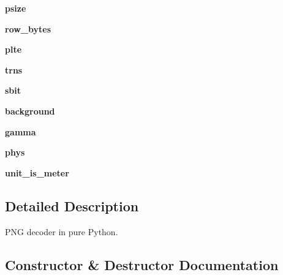 \begin{DoxyCompactItemize}
{\bfseries psize}
\item 
\mbox{\label{classlib_1_1png_1_1_reader_ab8959119a3485bb8f156776dcef51fe1}} 
{\bfseries row\+\_\+bytes}
\item 
\mbox{\label{classlib_1_1png_1_1_reader_a109bee51b6befa0aba939358eb238b54}} 
{\bfseries plte}
\item 
\mbox{\label{classlib_1_1png_1_1_reader_a75480dedbc8a789e3f3a4e38e8285377}} 
{\bfseries trns}
\item 
\mbox{\label{classlib_1_1png_1_1_reader_a48db770b0e7c0bf9b7e96a12c47d0c56}} 
{\bfseries sbit}
\item 
\mbox{\label{classlib_1_1png_1_1_reader_a8e6bc9daae77e2e47ce994159bdcf917}} 
{\bfseries background}
\item 
\mbox{\label{classlib_1_1png_1_1_reader_a7956a3dab9c08caf0f2325798ceb910b}} 
{\bfseries gamma}
\item 
\mbox{\label{classlib_1_1png_1_1_reader_aafcc91567af9b456c02d68e167184505}} 
{\bfseries phys}
\item 
\mbox{\label{classlib_1_1png_1_1_reader_a4e5f42711152bbb2455257bb61292d6d}} 
{\bfseries unit\+\_\+is\+\_\+meter}
\end{DoxyCompactItemize}


\subsection{Detailed Description}
\begin{DoxyVerb}PNG decoder in pure Python.
\end{DoxyVerb}
 

\subsection{Constructor \& Destructor Documentation}
\mbox{\label{classlib_1_1png_1_1_reader_a4f3aee6939d0cb1a6d978f9450b18fb3}} 

